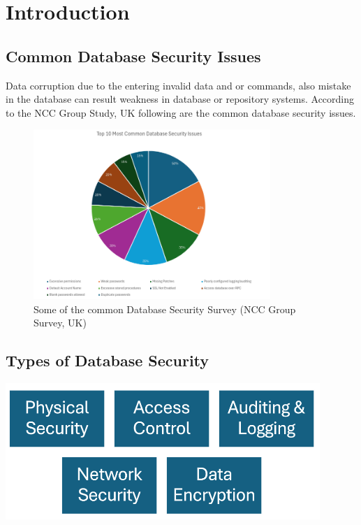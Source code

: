 \documentclass[12pt]{book} %
\begin{document}
\section*{Introduction}


\subsection*{Common Database Security Issues}


Data corruption due to the entering invalid data and or commands, also mistake in the database can result weakness in database or repository systems. According to the NCC Group Study, UK following are the common
database security issues.\cite{db_security_an_overview_and_analysis_of_current_trend} \label{sec:db_security_an_overview_and_analysis_of_current_trend_1}\\

\begin{figure}[h]
	\begin{center}
	\includegraphics[width=0.8\textwidth]{assets/top_10_most_common_db_security_issues.png}
	\end{center}
	\caption[]{Some of the common Database Security
    Survey (NCC Group Survey, UK)}
	\label{fig:top_10_most_common_db_security_issues}
\end{figure}


\subsection*{Types of Database Security}

\includegraphics[width=450px]{assets/types_of_db_security.png}\\[1cm] %
\end{document}
